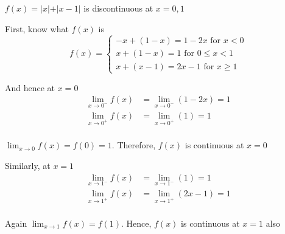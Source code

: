 \documentclass[14pt,fleqn]{extarticle}
\begin{document}
 
\begin{snippet}
    
    \incorrect
    $f(x) = \vert x\vert + \vert x - 1\vert$ is discontinuous at $x= 0,1$ 
    \reason
    
    First, know what $f(x)$ is 
    \[ f(x) = \begin{cases} 
    -x + (1-x) = 1-2x\text{ for } x < 0 \\
    x + (1-x) = 1\text{ for } 0\leq x < 1 \\
    x + (x-1) = 2x - 1 \text{ for } x \geq 1 
    \end{cases} \]
    
    And hence at $x=0$ 
    \begin{align}
	\lim_{x\to 0^-} f(x) &= \lim_{x\to 0^-} \left(1-2x \right) = 1 \\
	\lim_{x\to 0^+} f(x) &= \lim_{x\to 0^+} \left(1 \right) = 1 \\
\end{align}

$\lim_{x\to 0} f(x) = f(0) = 1$. Therefore, $f(x)$ is continuous at $x=0$ \newline 

Similarly, at $x=1$ 
\begin{align}
	\lim_{x\to 1^-} f(x) &= \lim_{x\to 1^-} \left(1\right) = 1 \\
	\lim_{x\to 1^+} f(x) &= \lim_{x\to 1^+} \left(2x-1 \right) = 1 \\
\end{align}

Again $\lim_{x\to 1}f(x) = f(1)$. Hence, $f(x)$ is continuous at $x=1$ also 

\end{snippet} 
\end{document}
